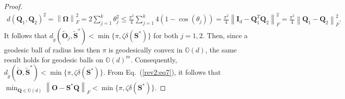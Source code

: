 \documentclass[10pt,a4paper]{amsart}
\begin{document}
\begin{proof}
\begin{align}
 d(\mathbf{Q}_1,\mathbf{Q}_2)^2 = \left\|\bm{\Omega}\right\|_F^2 = 2\sum_{j=1}^{k}\theta_j^2 \leq \frac{\pi^2}{4} \sum_{j=1}^{k} 4(1-\cos(\theta_j)) = \frac{\pi^2}{4} \left\|\mathbf{I}_d - \mathbf{Q}_1^T\mathbf{Q}_2\right\|_F^2 = \frac{\pi^2}{4} \left\|\mathbf{Q}_1-\mathbf{Q}_2\right\|_F^2.
\end{align}
It follows that $d_{\widetilde{g}}(\widetilde{\mathbf{O}}_j,\widetilde{\mathbf{S}}^{*}) < \min\{\pi, \zeta \delta(\mathbf{S}^*)\}$ for both $j=1,2$. Then, since a geodesic ball of radius less then $\pi$ is geodesically convex in $\mathbb{O}(d)$, the same result holds for geodesic balls on $\mathbb{O}(d)^m$. Consequently, $d_{\widetilde{g}}(\widetilde{\mathbf{O}},\widetilde{\mathbf{S}}^{*}) < \min\{\pi, \zeta \delta(\mathbf{S}^*)\}$. From Eq.~(\ref{rev2:eq7}), it follows that $\min_{\mathbf{Q}\in \mathbb{O}(d)} \left\|\mathbf{O} -\mathbf{S}^{*}\mathbf{Q}\right\|_F < \min\{\pi,\zeta \delta(\mathbf{S}^*)\}$.
\end{proof}
\end{document}

